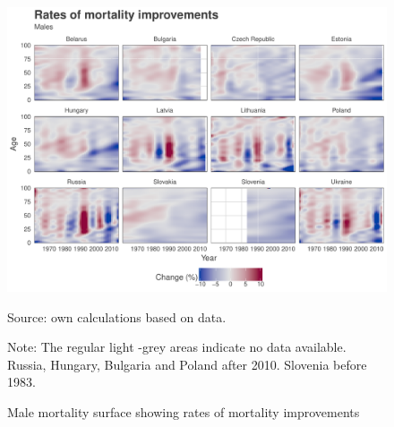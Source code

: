 \documentclass{article}
\begin{document}
\begin{landscape}
\begin{table}
\end{table}
\end{landscape}

\newpage

\begin{figure}[h!]
\caption{Male mortality surface showing rates of mortality improvements}
\label{Fig_ROMI}
\centering
\begin{center}
\includegraphics[scale=.55]{Figures/Romi_males.pdf}
\end{center}
Source: own calculations based on \citet{HMD} data. 
\begin{small}
Note: The regular light -grey areas indicate no data available. Russia, Hungary, Bulgaria and Poland after 2010. Slovenia before 1983.
\end{small}
\end{figure}
\end{document}
